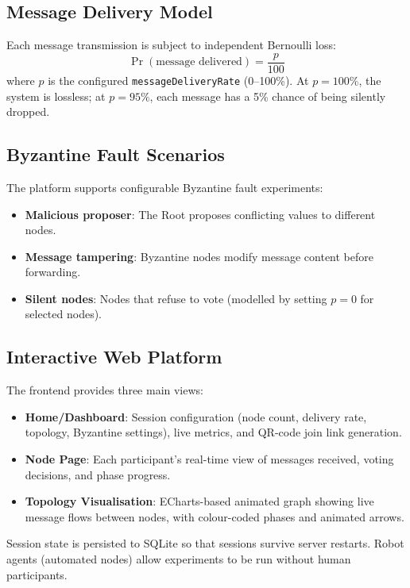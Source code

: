 \documentclass[
12pt,
oneside,
singlespacing,
parskip,
]{article}
\begin{document}
\subsection{Message Delivery Model}

Each message transmission is subject to independent Bernoulli loss:
\begin{equation}
  \Pr(\text{message delivered}) = \frac{p}{100}
\end{equation}
where $p$ is the configured \texttt{messageDeliveryRate} (0--100\%). At $p = 100\%$, the system is lossless; at $p = 95\%$, each message has a 5\% chance of being silently dropped.

\subsection{Byzantine Fault Scenarios}

The platform supports configurable Byzantine fault experiments:
\begin{itemize}
  \item \textbf{Malicious proposer}: The Root proposes conflicting values to different nodes.
  \item \textbf{Message tampering}: Byzantine nodes modify message content before forwarding.
  \item \textbf{Silent nodes}: Nodes that refuse to vote (modelled by setting $p = 0$ for selected nodes).
\end{itemize}

\subsection{Interactive Web Platform}

The frontend provides three main views:
\begin{itemize}
  \item \textbf{Home/Dashboard}: Session configuration (node count, delivery rate, topology, Byzantine settings), live metrics, and QR-code join link generation.
  \item \textbf{Node Page}: Each participant's real-time view of messages received, voting decisions, and phase progress.
  \item \textbf{Topology Visualisation}: ECharts-based animated graph showing live message flows between nodes, with colour-coded phases and animated arrows.
\end{itemize}

Session state is persisted to SQLite so that sessions survive server restarts. Robot agents (automated nodes) allow experiments to be run without human participants.
\end{document}
